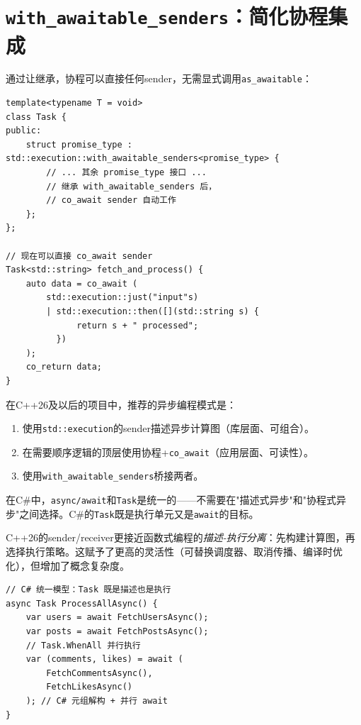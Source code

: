 \documentclass[12pt,a4paper,fontset=fandol]{ctexbook}
\newcommand{\cpp}[1]{C++#1}
\newcommand{\csharp}{C\#}
\begin{document}
\section{\texttt{with\_awaitable\_senders}：简化协程集成}

通过让\texttt{}继承\texttt{}，\allowbreak{}协程可以直接\texttt{}任何sender，无需显式调用\texttt{as\_awaitable}：

\begin{lstlisting}
template<typename T = void>
class Task {
public:
    struct promise_type : std::execution::with_awaitable_senders<promise_type> {
        // ... 其余 promise_type 接口 ...
        // 继承 with_awaitable_senders 后，
        // co_await sender 自动工作
    };
};

// 现在可以直接 co_await sender
Task<std::string> fetch_and_process() {
    auto data = co_await (
        std::execution::just("input"s)
        | std::execution::then([](std::string s) {
              return s + " processed";
          })
    );
    co_return data;
}
\end{lstlisting}

\begin{bestpractice}
在\cpp{}26及以后的项目中，推荐的异步编程模式是：
\begin{enumerate}[nosep]
\item 使用\texttt{std::execution}的sender描述异步计算图（库层面、可组合）。
\item 在需要顺序逻辑的顶层使用协程+\texttt{co\_await}（应用层面、可读性）。
\item 使用\texttt{with\_awaitable\_senders}桥接两者。
\end{enumerate}
\end{bestpractice}

\begin{compare}
在\csharp{}中，\texttt{async/await}和\texttt{Task}是统一的——不需要在"描述式异步"和"协程式异步"之间选择。\csharp{}的\texttt{Task}既是执行单元又是\texttt{await}的目标。

\cpp{}26的sender/receiver更接近函数式编程的\emph{描述-执行分离}：先构建计算图，再选择执行策略。这赋予了更高的灵活性（可替换调度器、取消传播、编译时优化），但增加了概念复杂度。

\begin{lstlisting}[style=csharpstyle]
// C# 统一模型：Task 既是描述也是执行
async Task ProcessAllAsync() {
    var users = await FetchUsersAsync();
    var posts = await FetchPostsAsync();
    // Task.WhenAll 并行执行
    var (comments, likes) = await (
        FetchCommentsAsync(),
        FetchLikesAsync()
    ); // C# 元组解构 + 并行 await
}
\end{lstlisting}
\end{compare}
\end{document}
